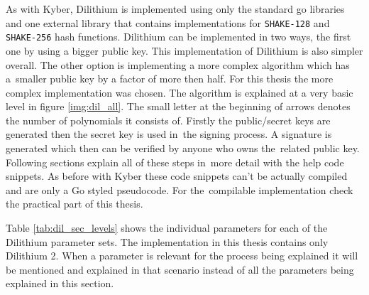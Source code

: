 As with Kyber, Dilithium is implemented using only the standard go libraries and one external library \cite{00fV2cvg7Z6H2tS3} that contains implementations for \texttt{SHAKE-128} and \texttt{SHAKE-256} hash functions. Dilithium can be implemented in two ways, the first one by using a bigger public key. This implementation of Dilithium is also simpler overall. The other option is implementing a more complex algorithm which has a~smaller public key by a factor of more then half. For this thesis the more complex implementation was chosen. The algorithm is explained at a very basic level in figure \ref{img:dil_all}. The small letter at the beginning of arrows denotes the number of polynomials it consists of. Firstly the public/secret keys are generated then the secret key is used in~the signing process. A signature is generated which then can be verified by anyone who owns the~related public key. Following sections explain all of these steps in~more detail with the help code snippets. As before with Kyber these code snippets can't be actually compiled and are only a Go styled pseudocode. For the~compilable implementation check the practical part of this thesis.


Table \ref{tab:dil_sec_levels} shows the individual parameters for each of the Dilithium parameter sets. The implementation in this thesis contains only Dilithium 2. When a parameter is relevant for the process being explained it will be mentioned and explained in that scenario instead of all the parameters being explained in this section.


